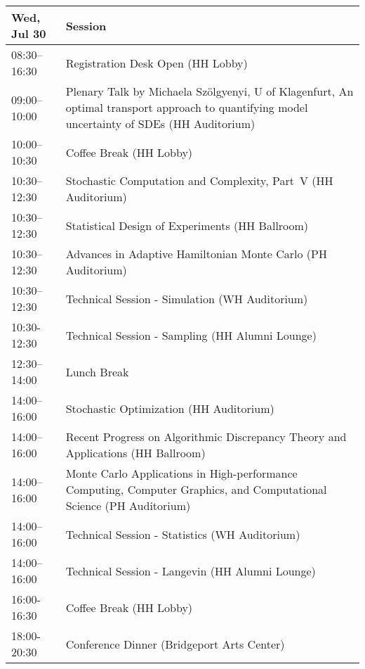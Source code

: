 \begin{table}
{\footnotesize
\begin{tabularx}{\textwidth}{>{\hsize=0.32\hsize}X|>{\hsize=1.7\hsize}X}
\hline
\textbf{Wed, Jul 30} & \textbf{Session} \\
\hline
\cellcolor{\EmptyColor}08:30–16:30 & \cellcolor{\EmptyColor}Registration Desk Open (HH Lobby) \\
\cellcolor{\PlenaryColor}09:00–10:00 & \cellcolor{\PlenaryColor}Plenary Talk by Michaela Szölgyenyi, U of Klagenfurt, An optimal transport approach to quantifying model uncertainty of SDEs (HH Auditorium) \\
\cellcolor{\EmptyColor}10:00–10:30 & \cellcolor{\EmptyColor}Coffee Break (HH Lobby) \\
\cellcolor{\SessionTitleColor}10:30–12:30 & \cellcolor{\SessionTitleColor}Stochastic Computation and Complexity, Part~V (HH Auditorium) \\
\cellcolor{\SessionTitleColor}10:30–12:30 & \cellcolor{\SessionTitleColor}Statistical Design of Experiments (HH Ballroom) \\
\cellcolor{\SessionTitleColor}10:30–12:30 & \cellcolor{\SessionTitleColor}Advances in Adaptive Hamiltonian Monte Carlo (PH Auditorium) \\
\cellcolor{\SessionLightColor}10:30–12:30 & \cellcolor{\SessionLightColor}Technical Session - Simulation (WH Auditorium) \\
\cellcolor{\SessionLightColor}10:30-12:30 & \cellcolor{\SessionLightColor}Technical Session - Sampling (HH Alumni Lounge) \\
\cellcolor{\EmptyColor}12:30–14:00 & \cellcolor{\EmptyColor}Lunch Break \\
\cellcolor{\SessionTitleColor}14:00–16:00 & \cellcolor{\SessionTitleColor}Stochastic Optimization (HH Auditorium) \\
\cellcolor{\SessionTitleColor}14:00–16:00 & \cellcolor{\SessionTitleColor}Recent Progress on Algorithmic Discrepancy Theory and Applications (HH Ballroom) \\
\cellcolor{\SessionTitleColor}14:00–16:00 & \cellcolor{\SessionTitleColor}Monte Carlo Applications in High-performance Computing, Computer Graphics, and Computational Science (PH Auditorium) \\
\cellcolor{\SessionLightColor}14:00–16:00 & \cellcolor{\SessionLightColor}Technical Session - Statistics (WH Auditorium) \\
\cellcolor{\SessionLightColor}14:00–16:00 & \cellcolor{\SessionLightColor}Technical Session - Langevin (HH Alumni Lounge) \\
\cellcolor{\EmptyColor}16:00-16:30 & \cellcolor{\EmptyColor}Coffee Break (HH Lobby) \\
\cellcolor{\EmptyColor}18:00-20:30 & \cellcolor{\EmptyColor}Conference Dinner (Bridgeport Arts Center) \\
\hline
\end{tabularx}
}
\end{table}

